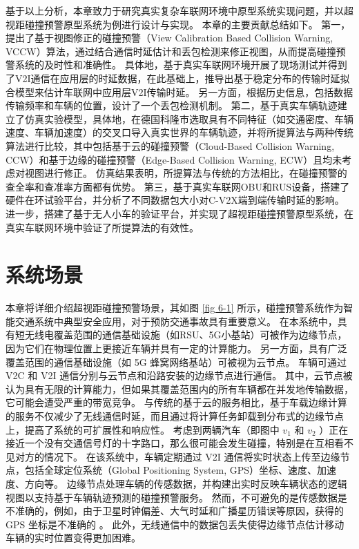 基于以上分析，本章致力于研究真实复杂车联网环境中原型系统实现问题，并以超视距碰撞预警原型系统为例进行设计与实现。
本章的主要贡献总结如下。
第一，提出了基于视图修正的碰撞预警（View Calibration Based Collision Warning, VCCW）算法，通过结合通信时延估计和丢包检测来修正视图，从而提高碰撞预警系统的及时性和准确性。
具体地，基于真实车联网环境开展了现场测试并得到了V2I通信在应用层的时延数据，在此基础上，推导出基于稳定分布的传输时延拟合模型来估计车联网中应用层V2I传输时延。
另一方面，根据历史信息，包括数据传输频率和车辆的位置，设计了一个丢包检测机制。
第二，基于真实车辆轨迹建立了仿真实验模型，具体地，在德国科隆市选取具有不同特征（如交通密度、车辆速度、车辆加速度）的交叉口导入真实世界的车辆轨迹，并将所提算法与两种传统算法进行比较，其中包括基于云的碰撞预警（Cloud-Based Collision Warning, CCW）和基于边缘的碰撞预警（Edge-Based Collision Warning, ECW）且均未考虑对视图进行修正。
仿真结果表明，所提算法与传统的方法相比，在碰撞预警的查全率和查准率方面都有优势。
第三，基于真实车联网OBU和RUS设备，搭建了硬件在环试验平台，并分析了不同数据包大小对C-V2X端到端传输时延的影响。
进一步，搭建了基于无人小车的验证平台，并实现了超视距碰撞预警原型系统，在真实车联网环境中验证了所提算法的有效性。


\section{系统场景}\label{section 6-2}

本章将详细介绍超视距碰撞预警场景，其如图 \ref{fig 6-1} 所示，碰撞预警系统作为智能交通系统中典型安全应用，对于预防交通事故具有重要意义。
在本系统中，具有短无线电覆盖范围的通信基础设施（如RSU、5G小基站）可被作为边缘节点，因为它们在物理位置上更接近车辆并具有一定的计算能力。
另一方面，具有广泛覆盖范围的通信基础设施（如 5G 蜂窝网络基站）可被视为云节点。
车辆可通过 V2C 和 V2I 通信分别与云节点和沿路安装的边缘节点进行通信。
其中，云节点被认为具有无限的计算能力，但如果其覆盖范围内的所有车辆都在并发地传输数据，它可能会遭受严重的带宽竞争。 
与传统的基于云的服务相比，基于车载边缘计算的服务不仅减少了无线通信时延，而且通过将计算任务卸载到分布式的边缘节点上，提高了系统的可扩展性和响应性。
考虑到两辆汽车（即图中 $v_1$ 和 $v_2$ ）正在接近一个没有交通信号灯的十字路口，那么很可能会发生碰撞，特别是在互相看不见对方的情况下。
在该系统中，车辆定期通过 V2I 通信将实时状态上传至边缘节点，包括全球定位系统（Global Positioning System, GPS）坐标、速度、加速度、方向等。
边缘节点处理车辆的传感数据，并构建出实时反映车辆状态的逻辑视图以支持基于车辆轨迹预测的碰撞预警服务。
然而，不可避免的是传感数据是不准确的，例如，由于卫星时钟偏差、大气时延和广播星历错误等原因，获得的 GPS 坐标是不准确的 \cite{liu2013improving}。
此外，无线通信中的数据包丢失使得边缘节点估计移动车辆的实时位置变得更加困难。

